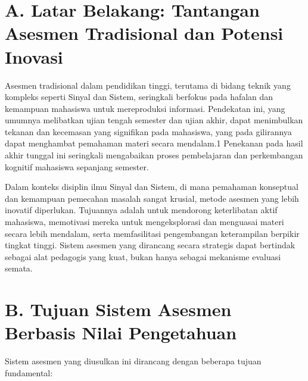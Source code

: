 \documentclass[
  letterpaper,
  DIV=11,
  numbers=noendperiod]{scrreprt}
\begin{document}
\section{A. Latar Belakang: Tantangan Asesmen Tradisional dan Potensi
Inovasi}\label{a.-latar-belakang-tantangan-asesmen-tradisional-dan-potensi-inovasi}

Asesmen tradisional dalam pendidikan tinggi, terutama di bidang teknik
yang kompleks seperti Sinyal dan Sistem, seringkali berfokus pada
hafalan dan kemampuan mahasiswa untuk mereproduksi informasi. Pendekatan
ini, yang umumnya melibatkan ujian tengah semester dan ujian akhir,
dapat menimbulkan tekanan dan kecemasan yang signifikan pada mahasiswa,
yang pada gilirannya dapat menghambat pemahaman materi secara mendalam.1
Penekanan pada hasil akhir tunggal ini seringkali mengabaikan proses
pembelajaran dan perkembangan kognitif mahasiswa sepanjang semester.

Dalam konteks disiplin ilmu Sinyal dan Sistem, di mana pemahaman
konseptual dan kemampuan pemecahan masalah sangat krusial, metode
asesmen yang lebih inovatif diperlukan. Tujuannya adalah untuk mendorong
keterlibatan aktif mahasiswa, memotivasi mereka untuk mengeksplorasi dan
menguasai materi secara lebih mendalam, serta memfasilitasi pengembangan
keterampilan berpikir tingkat tinggi. Sistem asesmen yang dirancang
secara strategis dapat bertindak sebagai alat pedagogis yang kuat, bukan
hanya sebagai mekanisme evaluasi semata.

\section{B. Tujuan Sistem Asesmen Berbasis Nilai
Pengetahuan}\label{b.-tujuan-sistem-asesmen-berbasis-nilai-pengetahuan}

Sistem asesmen yang diusulkan ini dirancang dengan beberapa tujuan
fundamental:
\end{document}
